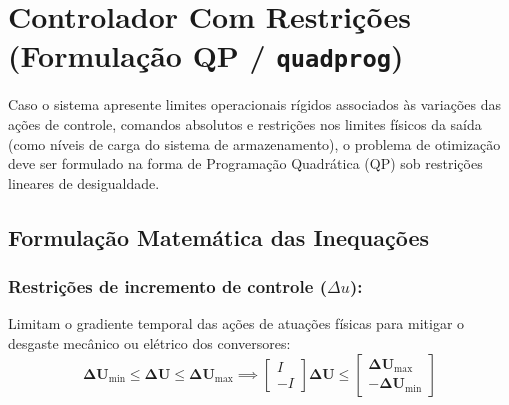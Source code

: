 \documentclass[12pt]{article}
\begin{document}
\section{Controlador Com Restrições (Formulação QP / \texttt{quadprog})}

Caso o sistema apresente limites operacionais rígidos associados às variações das ações de controle, comandos absolutos e restrições nos limites físicos da saída (como níveis de carga do sistema de armazenamento), o problema de otimização deve ser formulado na forma de Programação Quadrática (QP) sob restrições lineares de desigualdade.

\subsection{Formulação Matemática das Inequações}

\subsubsection{Restrições de incremento de controle ($\Delta u$):}
Limitam o gradiente temporal das ações de atuações físicas para mitigar o desgaste mecânico ou elétrico dos conversores:
\begin{equation}
\bm{\Delta U}_{\text{min}} \le \bm{\Delta U} \le \bm{\Delta U}_{\text{max}} \implies 
\begin{bmatrix} I \\ -I \end{bmatrix} \bm{\Delta U} \le \begin{bmatrix} \bm{\Delta U}_{\text{max}} \\ -\bm{\Delta U}_{\text{min}} \end{bmatrix}
\end{equation}
\end{document}
